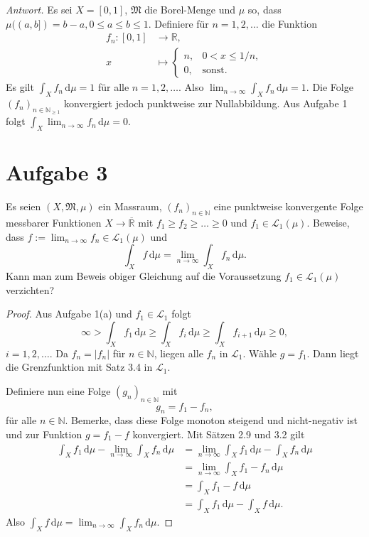 \documentclass[10pt]{article}\usepackage[]{graphicx}\usepackage[]{color}
\newcommand{\N}{\mathbb{N}}
\newcommand{\R}{\mathbb{R}}
\newcommand{\df}{\,\textrm{d}}
\begin{document}
\begin{enumerate}[(a)]
  \textit{Antwort.}
  Es sei $X = [0,1]$, $\mathfrak{M}$ die Borel-Menge
  und $\mu$ so, dass $\mu((a,b]) = b-a, 0 \leq a \leq b \leq 1$.
  Definiere für $n = 1, 2, \dots$ die Funktion
  \begin{align*}
    f_n: [0,1] &\to         \R,\\
         x     &\mapsto
                \begin{cases}
                  n, & 0 < x \leq 1/n, \\
                  0, & \textrm{sonst}.
                \end{cases}
  \end{align*}
  Es gilt $\int_X f_n \df \mu = 1$ für alle $n = 1, 2, \dots$.
  Also $\lim_{n \to \infty}\int_X f_n \df \mu = 1$.
  Die Folge $(f_n)_{n\in \N_{\geq 1}}$ konvergiert jedoch
  punktweise zur Nullabbildung.
  Aus Aufgabe 1 folgt $\int_X \lim_{n \to \infty} f_n \df \mu = 0$.
\end{enumerate}

\section*{Aufgabe 3}
Es seien $(X, \mathfrak{M}, \mu)$ ein Massraum,
$(f_n)_{n \in \N}$ eine punktweise konvergente Folge
messbarer Funktionen $X \to \overline{\R}$
mit $f_1 \geq f_2 \geq \dots \geq 0$
und $f_1 \in \mathscr{L}_1(\mu)$.
Beweise, dass $f:= \lim_{n \to \infty}f_n \in \mathscr{L}_1(\mu)$
und
  \[
    \int_X f \df \mu = \lim_{n \to \infty}\int_X f_n \df \mu.
  \]
Kann man zum Beweis obiger Gleichung auf die Voraussetzung
$f_1 \in \mathscr{L}_1(\mu)$ verzichten?

\begin{proof}
Aus Aufgabe 1(a) und $f_1 \in \mathscr{L}_1$
folgt 
\[
  \infty > \int_X f_1 \df \mu \geq \int_X f_i \df \mu \geq \int_X f_{i+1} \df \mu \geq 0,
\]
$i = 1, 2, \dots$.
Da $f_n = |f_n|$ für $n \in \N$, liegen alle $f_n$ in $\mathscr{L}_1$.
Wähle $g = f_1$. Dann liegt die Grenzfunktion mit Satz 3.4 in $\mathscr{L}_1$.

Definiere nun eine Folge $(g_n)_{n \in \N}$
mit 
\[
  g_n = f_1 - f_n,
\]
für alle $n \in \N$. Bemerke, dass diese Folge monoton steigend und nicht-negativ ist
und zur Funktion $g = f_1 - f$ konvergiert.
Mit Sätzen 2.9 und 3.2 gilt
\begin{align*}
  \int_X f_1 \df \mu - \lim_{n \to \infty} \int_X f_n \df \mu
  &= \lim_{n \to \infty}  \int_X f_1 \df \mu -  \int_X f_n \df \mu \\
  &= \lim_{n \to \infty} \int_X f_1 - f_n \df \mu \\
  &= \int_X f_1 - f \df \mu \\
  &= \int_X f_1 \df \mu - \int_X f \df \mu.
\end{align*}
Also $\int_X f \df \mu = \lim_{n \to \infty} \int_X f_n \df \mu$.
\end{proof}
\end{document}
